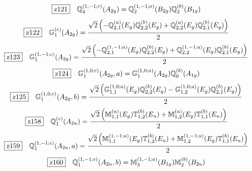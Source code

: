 \documentclass[fleqn,10pt,landscape]{jsarticle}
\begin{document}
\begin{dmath*}
\hspace*{3mm}\fbox{z121}\quad \mathbb{Q}_{4}^{(1,-1;c)}(A_{2g})=\mathbb{Q}_{2}^{(1,-1;a)}(B_{2g}) \mathbb{Q}_{2}^{(b)}(B_{1g})
\end{dmath*}
\begin{dmath*}
\hspace*{3mm}\fbox{z122}\quad \mathbb{G}_{1}^{(c)}(A_{2g})=\frac{\sqrt{2} \left(- \mathbb{Q}_{2,1}^{(a)}(E_{g}) \mathbb{Q}_{2,2}^{(b)}(E_{g}) + \mathbb{Q}_{2,2}^{(a)}(E_{g}) \mathbb{Q}_{2,1}^{(b)}(E_{g})\right)}{2}
\end{dmath*}
\begin{dmath*}
\hspace*{3mm}\fbox{z123}\quad \mathbb{G}_{1}^{(1,-1;c)}(A_{2g})=\frac{\sqrt{2} \left(- \mathbb{Q}_{2,1}^{(1,-1;a)}(E_{g}) \mathbb{Q}_{2,2}^{(b)}(E_{g}) + \mathbb{Q}_{2,2}^{(1,-1;a)}(E_{g}) \mathbb{Q}_{2,1}^{(b)}(E_{g})\right)}{2}
\end{dmath*}
\begin{dmath*}
\hspace*{3mm}\fbox{z124}\quad \mathbb{G}_{1}^{(1,0;c)}(A_{2g},a)=\mathbb{G}_{1}^{(1,0;a)}(A_{2g}) \mathbb{Q}_{0}^{(b)}(A_{1g})
\end{dmath*}
\begin{dmath*}
\hspace*{3mm}\fbox{z125}\quad \mathbb{G}_{1}^{(1,0;c)}(A_{2g},b)=\frac{\sqrt{2} \left(\mathbb{G}_{1,1}^{(1,0;a)}(E_{g}) \mathbb{Q}_{2,2}^{(b)}(E_{g}) - \mathbb{G}_{1,2}^{(1,0;a)}(E_{g}) \mathbb{Q}_{2,1}^{(b)}(E_{g})\right)}{2}
\end{dmath*}
\begin{dmath*}
\hspace*{3mm}\fbox{z158}\quad \mathbb{Q}_{1}^{(c)}(A_{2u})=\frac{\sqrt{2} \left(\mathbb{M}_{1,1}^{(a)}(E_{g}) \mathbb{T}_{1,2}^{(b)}(E_{u}) + \mathbb{M}_{1,2}^{(a)}(E_{g}) \mathbb{T}_{1,1}^{(b)}(E_{u})\right)}{2}
\end{dmath*}
\begin{dmath*}
\hspace*{3mm}\fbox{z159}\quad \mathbb{Q}_{1}^{(1,-1;c)}(A_{2u},a)=\frac{\sqrt{2} \left(\mathbb{M}_{1,1}^{(1,-1;a)}(E_{g}) \mathbb{T}_{1,2}^{(b)}(E_{u}) + \mathbb{M}_{1,2}^{(1,-1;a)}(E_{g}) \mathbb{T}_{1,1}^{(b)}(E_{u})\right)}{2}
\end{dmath*}
\begin{dmath*}
\hspace*{3mm}\fbox{z160}\quad \mathbb{Q}_{1}^{(1,-1;c)}(A_{2u},b)=\mathbb{M}_{3}^{(1,-1;a)}(B_{1g}) \mathbb{M}_{2}^{(b)}(B_{2u})
\end{dmath*}
\end{document}
